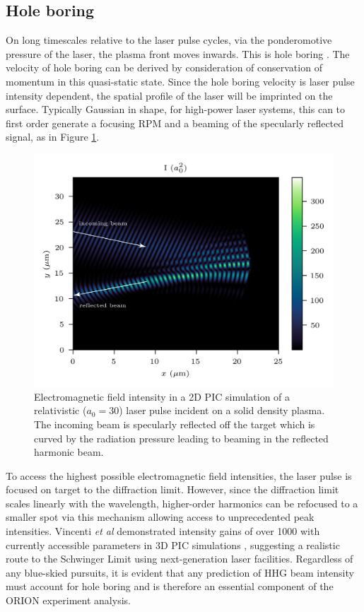\subsection{Hole boring}
On long timescales relative to the laser pulse cycles, via the ponderomotive pressure of the laser, the plasma front moves inwards. This is hole boring \cite{wilksAbsorptionUltraIntenseLaser1992}. The velocity of hole boring can be derived by consideration of conservation of momentum in this quasi-static state. Since the hole boring velocity is laser pulse intensity dependent, the spatial profile of the laser will be imprinted on the surface. Typically Gaussian in shape, for high-power laser systems, this can to first order generate a focusing \ac{RPM} and a beaming of the specularly reflected signal, as in Figure \ref{fig:orionholeboring}.
\begin{figure}
	\centering
	\includegraphics[width=0.9\linewidth]{figures/orion/orion_hole_boring}
	\caption[2D PIC simulation of HHG beaming effect via hole boring.]{Electromagnetic field intensity in a 2D PIC simulation of a relativistic ($a_0 = 30$) laser pulse incident on a solid density plasma. The incoming beam is specularly reflected off the target which is curved by the radiation pressure leading to beaming in the reflected harmonic beam.}
	\label{fig:orionholeboring}
\end{figure}
To access the highest possible electromagnetic field intensities, the laser pulse is focused on target to the diffraction limit. However, since the diffraction limit scales linearly with the wavelength, higher-order harmonics can be refocused to a smaller spot via this mechanism allowing access to unprecedented peak intensities. Vincenti \textit{et al} demonstrated intensity gains of over 1000 with currently accessible parameters in \ac{3D} \ac{PIC} simulations \cite{vincentiAchievingExtremeLight2019}, suggesting a realistic route to the Schwinger Limit using next-generation laser facilities. Regardless of any blue-skied pursuits, it is evident that any prediction of \ac{HHG} beam intensity must account for hole boring and is therefore an essential component of the ORION experiment analysis.

